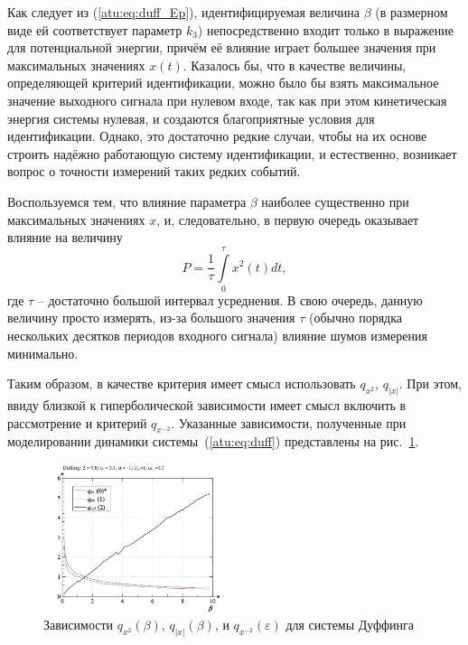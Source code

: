 Как следует из (\ref{atu:eq:duff_Ep}), идентифицируемая
величина \( \beta \)
(в размерном виде ей соответствует параметр \(k_3\))
непосредственно входит только в выражение для
потенциальной энергии, причём её влияние играет большее
значения при максимальных значениях \(x(t)\).
Казалось бы, что в качестве величины, определяющей
критерий идентификации, можно было бы взять
максимальное значение выходного сигнала
при нулевом входе, так как при этом кинетическая энергия системы нулевая,
и создаются благоприятные условия для идентификации.
Однако, это достаточно редкие случаи, чтобы на их основе
строить надёжно работающую систему идентификации, и
естественно, возникает вопрос о точности измерений таких редких
событий.

Воспользуемся тем, что влияние параметра \(\beta\)
наиболее существенно при максимальных значениях \(x\),
и, следовательно, в первую очередь оказывает влияние на величину
%
\begin{equation}
 P = \frac{1}{\tau}\int\limits_0^\tau x^2(t) dt ,
\label{atu:eq:duff_P}
\end{equation}
%
где \(\tau\) -- достаточно большой интервал усреднения.
В свою очередь, данную величину просто измерять,
из-за большого значения \(\tau\) (обычно порядка нескольких десятков
периодов входного сигнала) влияние шумов измерения минимально.

Таким образом, в качестве критерия имеет смысл использовать
$q_{x^2}$, $q_{|x|}$. При этом, ввиду близкой к гиперболической зависимости
имеет смысл включить в рассмотрение и критерий $q_{x^{-2}}$.
Указанные зависимости, полученные при моделировании динамики системы~(\ref{atu:eq:duff})
представлены на рис.~\ref{atu:f:duff_q}.

\begin{figure}[ht!]
\begin{center}
  \includegraphics[width=0.49\textwidth]{p/cha/duff/duff_q-p_q_1x00_0x70.png}
\end{center}
  \caption{Зависимости $q_{x^2}(\beta)$, $q_{|x|}(\beta)$,  и $q_{x^{-2}}(\varepsilon) $ для системы Дуффинга}
\label{atu:f:duff_q}
\end{figure}

